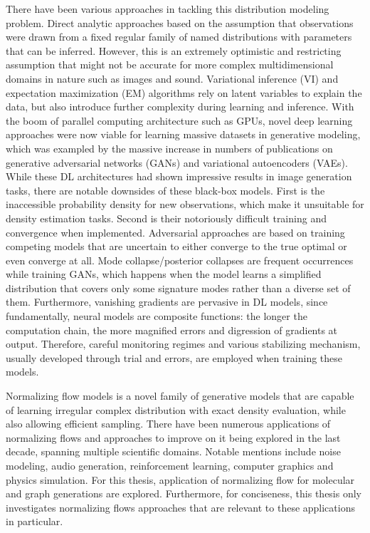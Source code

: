 There have been various approaches in tackling this distribution modeling
problem. Direct analytic approaches based on the assumption that observations
were drawn from a fixed regular family of named distributions with parameters
that can be inferred. However, this is an extremely optimistic and restricting
assumption that might not be accurate for more complex multidimensional domains
in nature such as images and sound. Variational inference (VI) and expectation
maximization (EM) algorithms rely on latent variables to explain the data, but
also introduce further complexity during learning and inference. With the boom
of parallel computing architecture such as GPUs, novel deep learning approaches
were now viable for learning massive datasets in generative modeling, which was
exampled by the massive increase in numbers of publications on generative
adversarial networks (GANs) and variational autoencoders (VAEs). While these DL
architectures had shown impressive results in image generation tasks, there are
notable downsides of these black-box models. First is the inaccessible
probability density for new observations, which make it unsuitable for density
estimation tasks. Second is their notoriously difficult training and convergence
when implemented. Adversarial approaches are based on training competing models
that are uncertain to either converge to the true optimal or even converge at
all. Mode collapse/posterior collapses are frequent occurrences while training
GANs, which happens when the model learns a simplified distribution that covers
only some signature modes rather than a diverse set of them. Furthermore,
vanishing gradients are pervasive in DL models, since fundamentally, neural
models are composite functions: the longer the computation chain, the more
magnified errors and digression of gradients at output. Therefore, careful
monitoring regimes and various stabilizing mechanism, usually developed through
trial and errors, are employed when training these models.

Normalizing flow models is a novel family of generative models that are capable
of learning irregular complex distribution with exact density evaluation, while
also allowing efficient sampling. There have been numerous applications of
normalizing flows and approaches to improve on it being explored in the last
decade, spanning multiple scientific domains. Notable mentions include noise
modeling, audio generation, reinforcement learning, computer graphics and
physics simulation. For this thesis, application of normalizing flow for
molecular and graph generations are explored. Furthermore, for
conciseness, this thesis only investigates normalizing flows approaches that are
relevant to these applications in particular.

